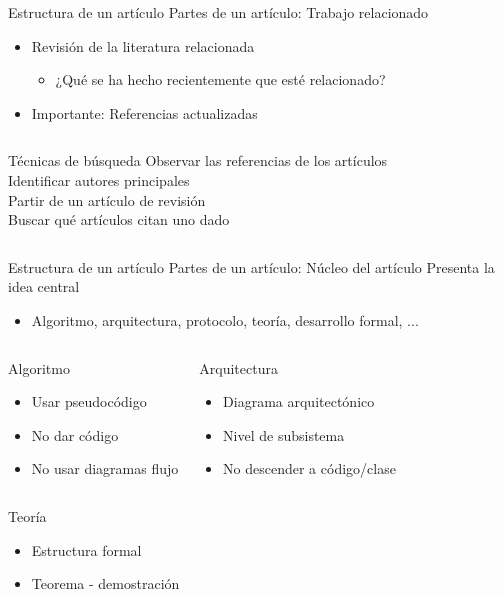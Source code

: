 \documentclass{beamer}
\begin{document}
\begin{frame}{Estructura de un artículo} {Partes de un artículo: Trabajo relacionado}
	\begin{itemize}
		\item Revisión de la literatura relacionada
			\begin{itemize}
			\item ¿Qué se ha hecho recientemente que esté relacionado?
			\end{itemize}
		\item Importante: \alert{Referencias actualizadas}
	\end{itemize}
	\begin{columns}
		\begin{block}{Técnicas de búsqueda}
			\centering Observar las referencias de los artículos\\
			Identificar autores principales\\
			Partir de un artículo de revisión\\
			Buscar qué artículos citan uno dado
		\end{block}
	\end{columns}
\end{frame}

\begin{frame}{Estructura de un artículo} {Partes de un artículo: Núcleo del artículo}
		Presenta la idea central
		\begin{itemize}
			\item Algoritmo, arquitectura, protocolo, teoría, desarrollo formal, ...
		\end{itemize}
	\begin{columns}
	\column{.5\textwidth}
		\begin{block}{Algoritmo}
		\begin{itemize}
			\item Usar pseudocódigo
			\item No dar código
			\item No usar diagramas flujo
		\end{itemize}
		\end{block}

	\column{.5\textwidth}
		\begin{block}{Arquitectura}
		\begin{itemize}
			\item Diagrama arquitectónico
			\item Nivel de subsistema
			\item No descender a código/clase
		\end{itemize}
		\end{block}
	\end{columns}

	\begin{columns}
	\begin{block}{Teoría}
	\begin{itemize}
		\item Estructura formal
		\item Teorema - demostración
	\end{itemize}
	\end{block}
	\end{columns}	
\end{frame}
\end{document}
